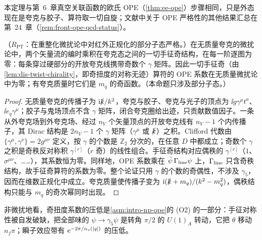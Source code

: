 本定理与第~6~章真空关联函数的欧氏 OPE（\cref{thm:ee-ope}）步骤相同，只是外态现在是夸克与胶子、算符取一切自旋；文献中关于 OPE 严格性的其他结果汇总在第~24~章（\cref{rem:front-ope-qcd-status}）。

\begin{proposition}\label{prop:dis-chiral-suppression}
（$R_{\mathrm{PT}}$：在重整化微扰论中对红外正规化的部分子态严格。）在无质量夸克的微扰论中，两个矢量流的编时乘积在夸克态之间的一切手征奇结构，在每一阶逐图为零：每条穿过硬部分的开放夸克线携带奇数个 $\gamma$ 矩阵。因此一切手征奇（由\cref{lem:dis-twist-chirality}，即奇扭度的对称无迹）算符的 OPE 系数在无质量微扰论中为零；有夸克质量时它们是 $m_q$ 的奇函数。（本命题只涉及部分子态。）
\end{proposition}

\begin{proof}
无质量夸克的传播子为 $\mathrm{i}\slashed{k}/k^2$，夸克与胶子、夸克与光子的顶点为 $\ii g\gamma^\mu t^a$、$\ii e_q\gamma^\mu$；胶子与鬼场顶点不含 $\gamma$ 矩阵，闭合夸克圈给出迹，只贡献数值因子。一条从外夸克场到外夸克场、经过 $n_V$ 个矢量顶点的开放夸克线有 $n_V-1$ 个内传播子，其 Dirac 结构是 $2n_V-1$ 个 $\gamma$ 矩阵（$\gamma^\mu$ 或 $\slashed{k}$）之积。Clifford 代数由 $\{\gamma^\mu,\gamma^\nu\}=2g^{\mu\nu}$ 定义，按 $\gamma$ 的个数是 $\mathbb Z_2$ 分次的，在任意 $D$ 中都成立；奇数个 $\gamma$ 之积是奇秩反对称积 $\gamma^{[r]}$（$r$ 奇）的线性组合。手征奇结构对应偶秩的 $\gamma^{[r]}$（$1$、$\sigma^{\mu\nu}$、……），其系数恒为零。同样地，OPE 系数乘在 $\bar\psi\,\Gamma_{\rm line}\psi$ 上，$\Gamma_{\rm line}$ 只含奇秩结构，故手征奇算符的系数为零。整个论证只用 $\gamma$ 的个数的奇偶性，不涉及 $\gamma_5$，因而在维数正规化中成立。夸克质量使传播子变为 $\mathrm{i}(\slashed{k}+m_q)/(k^2-m_q^2)$，偶秩结构只能与 $m_q$ 的奇次幂同时出现。
\end{proof}

非微扰地看，奇扭度系数的压低是\cref{asm:intro-np-ope}的 (O2) 的一部分：手征对称性被自发破缺，把全部味的 $\psi\to\gamma_5\psi$ 是转角 $\pi/2$ 的 $U(1)_A$ 转动，它把 $\theta$ 移动 $n_f\pi$；瞬子效应带有 $\mathrm{e}^{-2\pi/\alpha_s(|q|)}$ 的压低。

